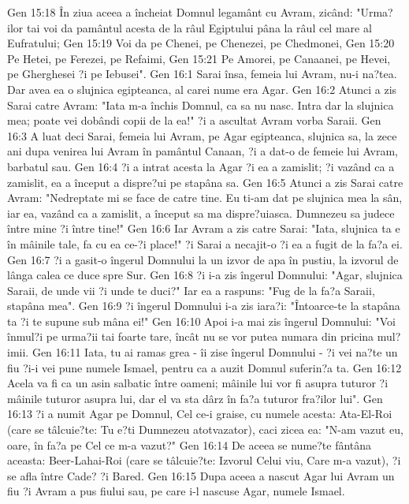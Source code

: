 Gen 15:18  În ziua aceea a încheiat Domnul legamânt cu Avram, zicând: "Urma?ilor tai voi da pamântul acesta de la râul Egiptului pâna la râul cel mare al Eufratului;
Gen 15:19  Voi da pe Chenei, pe Chenezei, pe Chedmonei,
Gen 15:20  Pe Hetei, pe Ferezei, pe Refaimi,
Gen 15:21  Pe Amorei, pe Canaanei, pe Hevei, pe Gherghesei ?i pe Iebusei".
Gen 16:1  Sarai însa, femeia lui Avram, nu-i na?tea. Dar avea ea o slujnica egipteanca, al carei nume era Agar.
Gen 16:2  Atunci a zis Sarai catre Avram: "Iata m-a închis Domnul, ca sa nu nasc. Intra dar la slujnica mea; poate vei dobândi copii de la ea!" ?i a ascultat Avram vorba Saraii.
Gen 16:3  A luat deci Sarai, femeia lui Avram, pe Agar egipteanca, slujnica sa, la zece ani dupa venirea lui Avram în pamântul Canaan, ?i a dat-o de femeie lui Avram, barbatul sau.
Gen 16:4  ?i a intrat acesta la Agar ?i ea a zamislit; ?i vazând ca a zamislit, ea a început a dispre?ui pe stapâna sa.
Gen 16:5  Atunci a zis Sarai catre Avram: "Nedreptate mi se face de catre tine. Eu ti-am dat pe slujnica mea la sân, iar ea, vazând ca a zamislit, a început sa ma dispre?uiasca. Dumnezeu sa judece între mine ?i între tine!"
Gen 16:6  Iar Avram a zis catre Sarai: "Iata, slujnica ta e în mâinile tale, fa cu ea ce-?i place!" ?i Sarai a necajit-o ?i ea a fugit de la fa?a ei.
Gen 16:7  ?i a gasit-o îngerul Domnului la un izvor de apa în pustiu, la izvorul de lânga calea ce duce spre Sur.
Gen 16:8  ?i i-a zis îngerul Domnului: "Agar, slujnica Saraii, de unde vii ?i unde te duci?" Iar ea a raspuns: "Fug de la fa?a Saraii, stapâna mea".
Gen 16:9  ?i îngerul Domnului i-a zis iara?i: "Întoarce-te la stapâna ta ?i te supune sub mâna ei!"
Gen 16:10  Apoi i-a mai zis îngerul Domnului: "Voi înmul?i pe urma?ii tai foarte tare, încât nu se vor putea numara din pricina mul?imii.
Gen 16:11  Iata, tu ai ramas grea - îi zise îngerul Domnului - ?i vei na?te un fiu ?i-i vei pune numele Ismael, pentru ca a auzit Domnul suferin?a ta.
Gen 16:12  Acela va fi ca un asin salbatic între oameni; mâinile lui vor fi asupra tuturor ?i mâinile tuturor asupra lui, dar el va sta dârz în fa?a tuturor fra?ilor lui".
Gen 16:13  ?i a numit Agar pe Domnul, Cel ce-i graise, cu numele acesta: Ata-El-Roi (care se tâlcuie?te: Tu e?ti Dumnezeu atotvazator), caci zicea ea: "N-am vazut eu, oare, în fa?a pe Cel ce m-a vazut?"
Gen 16:14  De aceea se nume?te fântâna aceasta: Beer-Lahai-Roi (care se tâlcuie?te: Izvorul Celui viu, Care m-a vazut), ?i se afla între Cade? ?i Bared.
Gen 16:15  Dupa aceea a nascut Agar lui Avram un fiu ?i Avram a pus fiului sau, pe care i-l nascuse Agar, numele Ismael.
